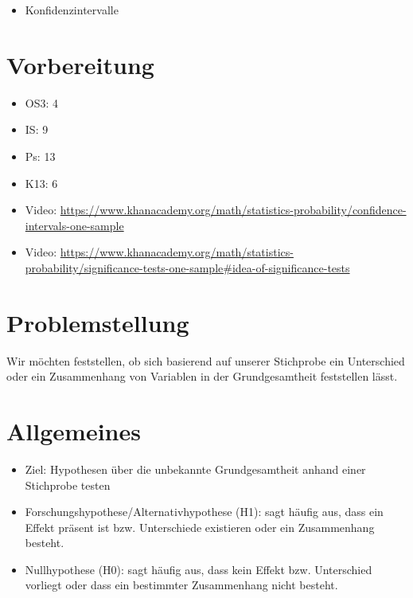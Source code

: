 \documentclass[
]{book}
\providecommand{\tightlist}{%
  \setlength{\itemsep}{0pt}\setlength{\parskip}{0pt}}
\begin{document}
\begin{itemize}
\tightlist
\item
  Konfidenzintervalle
\end{itemize}

\hypertarget{vorbereitung-3}{%
\section{Vorbereitung}\label{vorbereitung-3}}

\begin{itemize}
\tightlist
\item
  OS3: 4
\item
  IS: 9
\item
  Ps: 13
\item
  K13: 6
\item
  Video: \url{https://www.khanacademy.org/math/statistics-probability/confidence-intervals-one-sample}
\item
  Video: \url{https://www.khanacademy.org/math/statistics-probability/significance-tests-one-sample\#idea-of-significance-tests}
\end{itemize}

\hypertarget{problemstellung-1}{%
\section{Problemstellung}\label{problemstellung-1}}

Wir möchten feststellen, ob sich basierend auf unserer Stichprobe ein Unterschied oder ein Zusammenhang von Variablen in der Grundgesamtheit feststellen lässt.

\hypertarget{allgemeines-3}{%
\section{Allgemeines}\label{allgemeines-3}}

\begin{itemize}
\tightlist
\item
  Ziel: Hypothesen über die unbekannte Grundgesamtheit anhand einer Stichprobe testen
\item
  Forschungshypothese/Alternativhypothese (H1): sagt häufig aus, dass ein Effekt präsent ist bzw. Unterschiede existieren oder ein Zusammenhang besteht.
\item
  Nullhypothese (H0): sagt häufig aus, dass kein Effekt bzw. Unterschied vorliegt oder dass ein bestimmter Zusammenhang nicht besteht.
\end{itemize}
\end{document}
